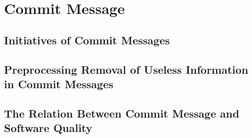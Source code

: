 \section{Commit Message}
\label{sec:message}
\subsection{Initiatives of Commit Messages}
\subsection{Preprocessing Removal of Useless Information in Commit Messages}
\subsection{The Relation Between Commit Message and Software Quality}